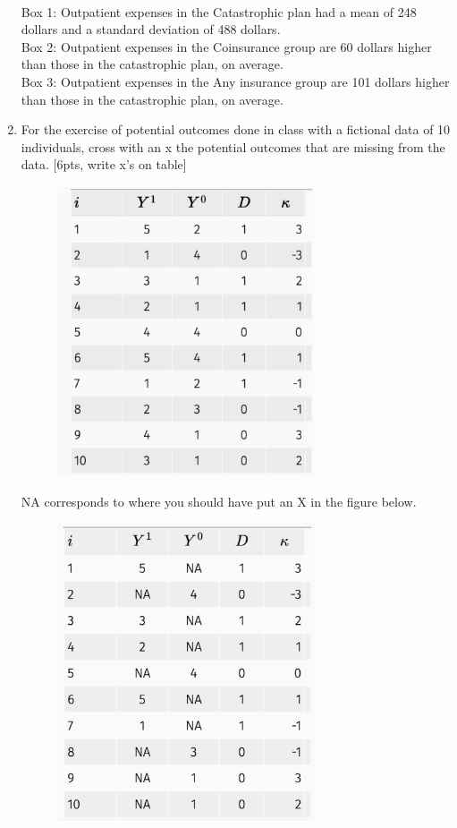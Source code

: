 \documentclass[answers]{exam}
\begin{document}
\begin{enumerate}
\begin{solution}
    \\
    Box 1: Outpatient expenses in the Catastrophic plan had a mean of 248 dollars and a standard deviation of 488 dollars. \\ 
    Box 2: Outpatient expenses in the Coinsurance group are 60 dollars higher than those in the catastrophic plan, on average. \\ 
    Box 3: Outpatient expenses in the Any insurance group are 101 dollars higher than those in the catastrophic plan, on average. 
\end{solution}

\item For the exercise of potential outcomes done in class with a fictional data of 10 individuals, cross with an x the potential outcomes that are missing from the data. [6pts, write x's on table] 
\begin{figure}[H]
    \centering
    \includegraphics[width=3in]{Figures/midterm_outcome.png}
    \caption{}
    \label{}
\end{figure}
\begin{solution}
NA corresponds to where you should have put an X in the figure below. 
\begin{figure}[H]
    \centering
    \includegraphics[width=3in]{Figures/midterm_outcome_sol.png}
    \caption{}
    \label{}
\end{figure}
\end{solution}



\end{enumerate}
\end{document}
